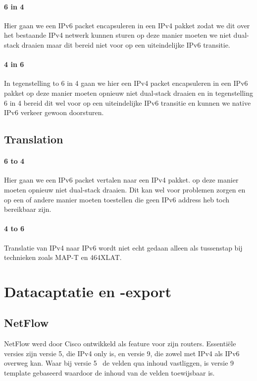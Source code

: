 \paragraph{6 in 4}
Hier gaan we een IPv6 packet encapsuleren in een IPv4 pakket zodat we dit over het bestaande IPv4 netwerk kunnen sturen op deze manier moeten we niet dual-stack draaien maar dit bereid niet voor op een uiteindelijke IPv6 transitie.


\paragraph{4 in 6}
In tegenstelling to 6 in 4 gaan  we hier een IPv4 packet encapsuleren in een IPv6 pakket op deze manier moeten opnieuw niet dual-stack draaien en in tegenstelling 6 in 4 bereid dit wel voor op een uiteindelijke IPv6 transitie en kunnen we native IPv6 verkeer gewoon doorsturen.


\subsection{Translation}
\paragraph{6 to 4}
Hier gaan we een IPv6 packet vertalen naar een IPv4 pakket. op deze manier moeten opnieuw niet dual-stack draaien. Dit kan wel voor problemen zorgen en op een of andere manier moeten toestellen die geen IPv6 address heb toch bereikbaar zijn.

\paragraph{4 to 6}
Translatie van IPv4 naar IPv6 wordt niet echt gedaan alleen als tussenstap bij technieken zoals MAP-T en 464XLAT.

\section{Datacaptatie en -export}
\subsection{NetFlow}
NetFlow werd door Cisco ontwikkeld als feature voor zijn routers. Essentiële versies zijn versie 5, die IPv4 only is, en versie 9, die zowel met IPv4 als IPv6 overweg kan. Waar bij versie 5~\autocite{Cisco2007} de velden qua inhoud vastliggen, is versie 9~\autocite{Claise2004} template gebaseerd waardoor de inhoud van de velden toewijsbaar is.

